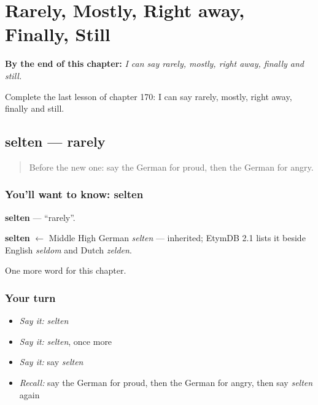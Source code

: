 
\chapter{Rarely, Mostly, Right away, Finally, Still}
\label{ch:ge-rarely-mostly-right-away-finally-still}

\begin{chapteropening}
\textbf{By the end of this chapter:} \emph{I can say rarely, mostly, right away, finally and still.}

Complete the last lesson of chapter 170: I can say rarely, mostly, right away, finally and still.
\end{chapteropening}

\section[selten]{selten — rarely}

\label{lesson:GE-C170-selten}



\begin{quote}
Before the new one: say the German for proud, then the German for angry.
\end{quote}

\subsection*{You'll want to know: selten}
\textbf{selten} — \textquotedblleft{}rarely\textquotedblright{}.

\begin{cousinweb}
\textbf{selten} $\leftarrow$ Middle High German \emph{selten} — inherited; EtymDB 2.1 lists it beside English \emph{seldom} and Dutch \emph{zelden}.
\end{cousinweb}

\begin{grammarlens}[title={What you've built}]
One more word for this chapter.
\end{grammarlens}

\subsection*{Your turn}
\begin{itemize}
\raggedright
  \item \emph{Say it:} \emph{selten}
  \item \emph{Say it:} \emph{selten}, once more
  \item \emph{Say it:} say \emph{selten}
  \item \emph{Recall:} say the German for proud, then the German for angry, then say \emph{selten} again
\end{itemize}

